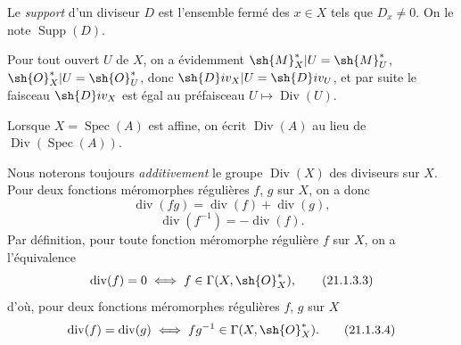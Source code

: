 
Le \emph{support} d'un diviseur $D$ est l'ensemble fermé des $x\in X$ tels que $D_x\neq0$.
On le note $\operatorname{Supp}(D)$.

Pour tout ouvert $U$ de $X$, on a évidemment $\sh{M}_X^*|U=\sh{M}_U^*$, $\sh{O}_X^*|U=\sh{O}_U^*$, donc $\sh{D}iv_X|U=\sh{D}iv_U$, et par suite le faisceau $\sh{D}iv_X$ est égal au préfaisceau $U\mapsto\operatorname{Div}(U)$.

Lorsque $X=\operatorname{Spec}(A)$ est affine, on écrit $\operatorname{Div}(A)$ au lieu de $\operatorname{Div}(\operatorname{Spec}(A))$.

\begin{env}[21.1.3]
\label{IV.21.1.3}
Nous noterons toujours \emph{additivement} le groupe $\operatorname{Div}(X)$ des diviseurs sur $X$.
Pour deux fonctions méromorphes régulières $f$, $g$ sur $X$, on a donc
\[
\label{IV.21.1.3.1}
  \operatorname{div}(fg)=\operatorname{div}(f)+\operatorname{div}(g),
  \tag{21.1.3.1}
\]
\[
\label{IV.21.1.3.2}
  \operatorname{div}(f^{-1})=-\operatorname{div}(f).
  \tag{21.1.3.2}
\]
Par définition, pour toute fonction méromorphe régulière $f$ sur $X$, on a l'équivalence
\[
\label{IV.21.1.3.3}
  \operatorname{div}(f)=0 \iff f\in\Gamma(X,\sh{O}_X^*),
  \tag{21.1.3.3}
\]
d'où, pour deux fonctions méromorphes régulières $f$, $g$ sur $X$
\[
\label{IV.21.1.3.4}
  \operatorname{div}(f)=\operatorname{div}(g) \iff fg^{-1}\in\Gamma(X,\sh{O}_X^*).
  \tag{21.1.3.4}
\]
\end{env}

